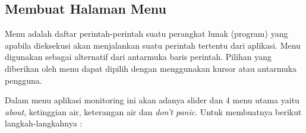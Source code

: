 \subsection{ Membuat Halaman Menu}
\par Menu adalah daftar perintah-perintah suatu perangkat lunak (program) yang apabila dieksekusi akan menjalankan suatu perintah tertentu dari aplikasi. Menu digunakan sebagai alternatif dari antarmuka baris perintah. Pilihan yang diberikan oleh menu dapat dipilih dengan menggunakan kursor atau antarmuka pengguna.

\par Dalam menu aplikasi monitoring ini akan adanya slider dan 4 menu utama yaitu \textit{about}, ketinggian air, keterangan air dan \textit{don't panic}. Untuk membuatnya berikut langkah-langkahnya :

